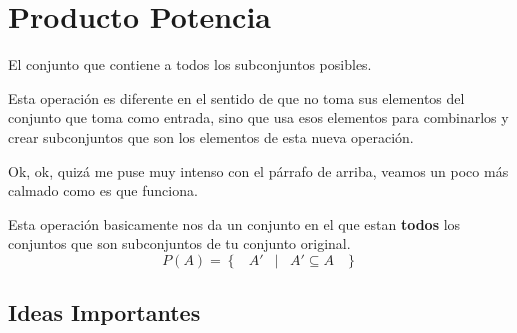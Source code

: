 \documentclass[12pt, fleqn]{report}                             %
\DeclareMathOperator \Space {\quad}                             %
\DeclareMathOperator \MiniSpace {\;}                            %
\newcommand \Such {\MiniSpace|\MiniSpace}                       %
\newcommand{\Set}[1]{\left\{ \MiniSpace #1 \MiniSpace \right\}} %
\begin{document}
        \clearpage
        \section{Producto Potencia}

            El conjunto que contiene a todos los subconjuntos posibles. 

            Esta operación es diferente en el sentido de que no toma sus elementos del conjunto
            que toma como entrada, sino que usa esos elementos para combinarlos y crear subconjuntos
            que son los elementos de esta nueva operación.

            Ok, ok, quizá me puse muy intenso con el párrafo de arriba, veamos un poco más calmado
            como es que funciona.

            Esta operación basicamente nos da un conjunto en el que estan \textbf{todos} los
            conjuntos que son subconjuntos de tu conjunto original.
            \begin{equation*}
                P(A) = \Set{ A' \Such A' \subseteq A}
            \end{equation*}


            \clearpage
            \subsection{Ideas Importantes}
\end{document}
